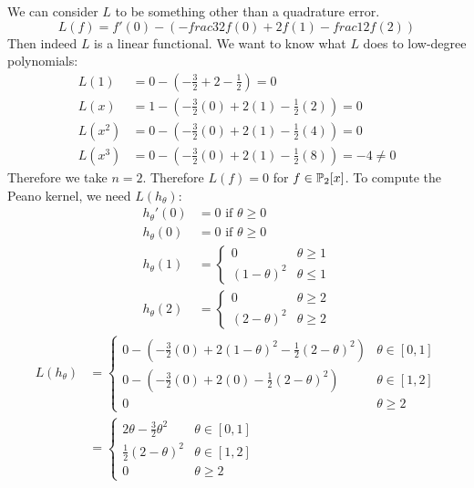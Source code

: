 \documentclass[../Main.tex]{subfiles}
\begin{document}
\begin{example}
    We can consider $L$ to be something other than a quadrature error.
    \begin{equation*}
        L(f) = f'(0) - \left(-frac32 f(0) + 2f(1) - frac12 f(2)\right)
    \end{equation*}
    Then indeed $L$ is a linear functional. We want to know what $L$ does to low-degree polynomials:
    \begin{align*}
        L(1) &= 0 - \left(-\frac32 + 2 - \frac12\right) = 0 \\
        L(x) &= 1 - \left(-\frac32 (0) + 2(1) - \frac12(2)\right) = 0 \\
        L(x^2) &= 0 - \left(-\frac32(0) + 2(1) - \frac12(4)\right) = 0 \\
        L(x^3) &= 0 - \left(-\frac32(0) + 2(1) - \frac12(8)\right) = -4 \neq 0
    \end{align*}
    Therefore we take $n = 2$. Therefore $L(f) = 0$ for $f \in \P_2[x]$. To compute the Peano kernel, we need $L(h_\theta)$:
    \begin{align*}
        h_\theta'(0) &= 0 \text{ if $\theta \geq 0$} \\
        h_\theta(0) &= 0 \text{ if $\theta \geq 0$} \\
        h_\theta(1) &=
        \begin{cases}
            0 & \theta \geq 1 \\
            (1 - \theta)^2 & \theta \leq 1
        \end{cases}\\
        h_\theta(2) &=
        \begin{cases}
            0 & \theta \geq 2 \\
            (2 - \theta)^2 & \theta \geq 2
        \end{cases}
    \end{align*}
    \begin{align*}
        L(h_\theta) &=
        \begin{cases}
            0 - \left(-\frac32(0) + 2(1 - \theta)^2 - \frac12 (2 - \theta)^2\right) & \theta \in [0, 1] \\
            0 - \left(-\frac32(0) + 2(0) - \frac12 (2 - \theta)^2\right) & \theta \in [1, 2] \\
            0 & \theta \geq 2
        \end{cases}\\
        &=
        \begin{cases}
            2\theta - \frac32\theta^2 & \theta \in [0, 1] \\
            \frac12 (2-\theta)^2 & \theta \in [1, 2] \\
            0 & \theta \geq 2
        \end{cases}
    \end{align*}
\end{example}
\end{document}
